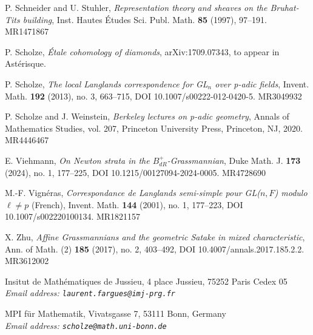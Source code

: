 \begin{refs}
\item[{[22]}] P. Schneider and U. Stuhler, \emph{Representation theory and sheaves on the Bruhat-Tits building}, Inst. Hautes \'Etudes Sci. Publ. Math. \textbf{85} (1997), 97--191. MR1471867
\item[{[23]}] P. Scholze, \emph{\'Etale cohomology of diamonds}, arXiv:1709.07343, to appear in Ast\'erisque.
\item[{[24]}] P. Scholze, \emph{The local Langlands correspondence for GL$_n$ over p-adic fields}, Invent. Math. \textbf{192} (2013), no. 3, 663--715, DOI 10.1007/s00222-012-0420-5. MR3049932
\item[{[25]}] P. Scholze and J. Weinstein, \emph{Berkeley lectures on p-adic geometry}, Annals of Mathematics Studies, vol. 207, Princeton University Press, Princeton, NJ, 2020. MR4446467
\item[{[26]}] E. Viehmann, \emph{On Newton strata in the $B^+_{dR}$-Grassmannian}, Duke Math. J. \textbf{173} (2024), no. 1, 177--225, DOI 10.1215/00127094-2024-0005. MR4728690
\item[{[27]}] M.-F. Vign\'eras, \emph{Correspondance de Langlands semi-simple pour GL($n,F$) modulo $\ell\neq p$} (French), Invent. Math. \textbf{144} (2001), no. 1, 177--223, DOI 10.1007/s002220100134. MR1821157
\item[{[28]}] X. Zhu, \emph{Affine Grassmannians and the geometric Satake in mixed characteristic}, Ann. of Math. (2) \textbf{185} (2017), no. 2, 403--492, DOI 10.4007/annals.2017.185.2.2. MR3612002
\end{refs}

\medskip
\begin{center}
{\small Insitut de Math\'ematiques de Jussieu, 4 place Jussieu, 75252 Paris Cedex 05\\[0.3em]
\itshape Email address: \texttt{laurent.fargues@imj-prg.fr}}

\medskip
{\small MPI f\"ur Mathematik, Vivatsgasse 7, 53111 Bonn, Germany\\[0.3em]
\itshape Email address: \texttt{scholze@math.uni-bonn.de}}
\end{center}
